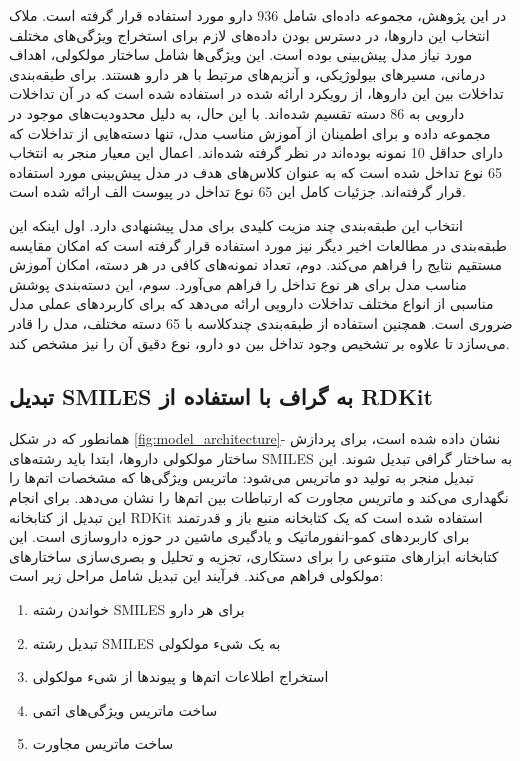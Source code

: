 در این پژوهش، مجموعه داده‌ای شامل 936 دارو مورد استفاده قرار گرفته است. ملاک انتخاب این داروها، در دسترس بودن داده‌های لازم برای استخراج ویژگی‌های مختلف مورد نیاز مدل پیش‌بینی بوده است. این ویژگی‌ها شامل ساختار مولکولی، اهداف درمانی، مسیرهای بیولوژیکی، و آنزیم‌های مرتبط با هر دارو هستند. برای طبقه‌بندی تداخلات بین این داروها، از رویکرد ارائه شده در \cite{ref_ryu2018} استفاده شده است که در آن تداخلات دارویی به 86 دسته تقسیم شده‌اند. با این حال، به دلیل محدودیت‌های موجود در مجموعه داده و برای اطمینان از آموزش مناسب مدل، تنها دسته‌هایی از تداخلات که دارای حداقل 10 نمونه بوده‌اند در نظر گرفته شده‌اند. اعمال این معیار منجر به انتخاب 65 نوع تداخل شده است که به عنوان کلاس‌های هدف در مدل پیش‌بینی مورد استفاده قرار گرفته‌اند. جزئیات کامل این 65 نوع تداخل در پیوست الف ارائه شده است.

انتخاب این طبقه‌بندی چند مزیت کلیدی برای مدل پیشنهادی دارد. اول اینکه این طبقه‌بندی در مطالعات اخیر دیگر نیز مورد استفاده قرار گرفته است \cite{ref_deng2020, ref_asfand2024} که امکان مقایسه مستقیم نتایج را فراهم می‌کند. دوم، تعداد نمونه‌های کافی در هر دسته، امکان آموزش مناسب مدل برای هر نوع تداخل را فراهم می‌آورد. سوم، این دسته‌بندی پوشش مناسبی از انواع مختلف تداخلات دارویی ارائه می‌دهد که برای کاربردهای عملی مدل ضروری است. همچنین استفاده از طبقه‌بندی چندکلاسه با 65 دسته مختلف، مدل را قادر می‌سازد تا علاوه بر تشخیص وجود تداخل بین دو دارو، نوع دقیق آن را نیز مشخص کند.

\subsection{تبدیل SMILES به گراف با استفاده از RDKit}

همانطور که در شکل \ref{fig:model_architecture}- نشان داده شده است، برای پردازش ساختار مولکولی داروها، ابتدا باید رشته‌های SMILES به ساختار گرافی تبدیل شوند. این تبدیل منجر به تولید دو ماتریس می‌شود: ماتریس ویژگی‌ها که مشخصات اتم‌ها را نگهداری می‌کند و ماتریس مجاورت که ارتباطات بین اتم‌ها را نشان می‌دهد. برای انجام این تبدیل از کتابخانه RDKit \cite{ref_rdkit} استفاده شده است که یک کتابخانه منبع باز و قدرتمند برای کاربردهای کمو-انفورماتیک و یادگیری ماشین در حوزه داروسازی است. این کتابخانه ابزارهای متنوعی را برای دستکاری، تجزیه و تحلیل و بصری‌سازی ساختارهای مولکولی فراهم می‌کند. فرآیند این تبدیل شامل مراحل زیر است:

\begin{enumerate}
	\item خواندن رشته SMILES برای هر دارو
	\item تبدیل رشته SMILES به یک شیء مولکولی
	\item استخراج اطلاعات اتم‌ها و پیوندها از شیء مولکولی
	\item ساخت ماتریس ویژگی‌های اتمی
	\item ساخت ماتریس مجاورت
\end{enumerate}

